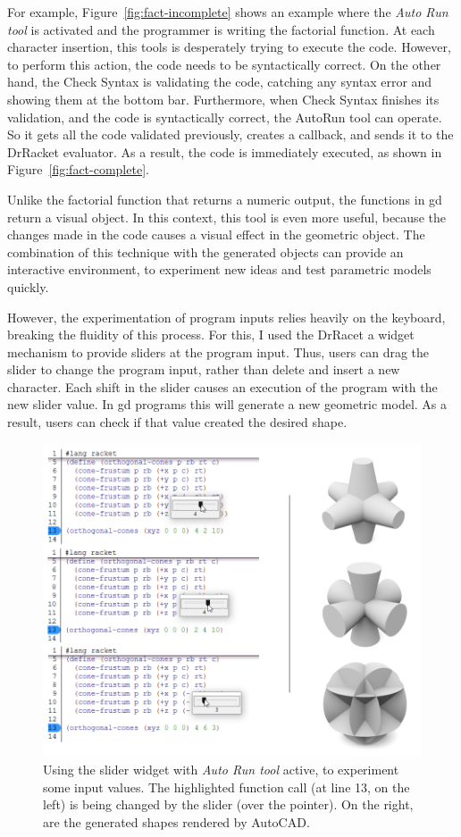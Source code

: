 For example, Figure~\ref{fig:fact-incomplete} shows an example where the \textit{Auto Run tool} is activated and the programmer is writing the factorial function. At each character insertion, this tools is desperately trying to execute the code. However, to perform this action, the code needs to be syntactically correct. On the other hand, the Check Syntax is validating the code, catching any syntax error and showing them at the bottom bar. Furthermore, when Check Syntax finishes its validation, and the code is syntactically correct, the AutoRun tool can operate. So it gets all the code validated previously, creates a callback, and sends it to the DrRacket evaluator. As a result, the code is immediately executed, as shown in Figure~\ref{fig:fact-complete}.

Unlike the factorial function that returns a numeric output, the functions in \gls{gd} return a visual object. In this context, this tool is even more useful, because the changes made in the code causes a visual effect in the geometric object. The combination of this technique with the generated objects can provide an interactive environment, to experiment new ideas and test parametric models quickly.

However, the experimentation of program inputs relies heavily on the keyboard, breaking the fluidity of this process. For this, I used the DrRacet a widget mechanism to provide sliders at the program input. Thus, users can drag the slider to change the program input, rather than delete and insert a new character. Each shift in the slider causes an execution of the program with the new slider value. In \gls{gd} programs this will generate a new geometric model. As a result, users can check if that value created the desired shape. 

\begin{figure}[!h]
  \centering
  \includegraphics[width=.8\textwidth]{images/orto-cones-run}
    \caption{Using the slider widget with \textit{Auto Run tool} active, to experiment some input values. The highlighted function call (at line 13, on the left) is being changed by the slider (over the pointer). On the right, are the generated shapes rendered by AutoCAD.}
  \label{fig:orto-cone-run}
\end{figure}

